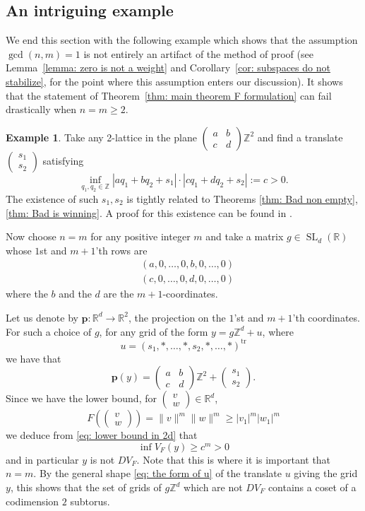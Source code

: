 \documentclass[reqno,11pt, twoside]{amsart}
\theoremstyle{plain}
\theoremstyle{definition}
\newtheorem{exmp}[thm]{Example}
\theoremstyle{definition}
\theoremstyle{remark}
\numberwithin{equation}{section}
\newcommand{\SL}{\operatorname{SL}}
\newcommand{\bR}{\mathbb{R}}
\newcommand{\bZ}{\mathbb{Z}}
\newcommand\norm[1]{\|#1\|}
\newcommand\pa[1]{\left(#1\right)}
\newcommand\av[1]{|#1|}
\newcommand\on[1]{\operatorname{#1}}
\newcommand\mb[1]{\mathbf{#1}}
\newcommand\mat[1]{\pa{\begin{matrix}#1\end{matrix}}}
\newcommand\smallmat[1]{\pa{\begin{smallmatrix}#1\end{smallmatrix}}}
\begin{document}
\subsection{An intriguing example}
We end this section with the following example which shows that the assumption
$\gcd(n,m)=1$ is not entirely an artifact of the method of proof (see Lemma~\ref{lemma: zero is not a weight} and Corollary~\ref{cor: subspaces do not stabilize}, for the point where this assumption enters our discussion). 
It shows that the statement of Theorem~\ref{thm: main theorem F formulation} can fail drastically when $n=m\ge 2$.
\begin{exmp}
    \label{exmp: counter n=m}
    Take any 2-lattice in the plane $\smallmat{a&b\\c&d}\bZ^2$ and find a translate $\smallmat{s_1\\ s_2}$
    satisfying 
    \begin{equation}
        \label{eq: lower bound in 2d}
    \inf_{q_1,q_2\in \bZ}\av{aq_1+bq_2+s_1}\cdot\av{cq_1+dq_2+s_2}:=c>0. 
    \end{equation}
    The existence of such $s_1,s_2$ is tightly related to Theorems 
    \ref{thm: Bad non empty}, \ref{thm: Bad is winning}. 
    A proof for this existence can be found in
    \cite[Theorem 1]{D}. 
    
    Now choose $n=m$ for any positive integer $m$ and take a matrix $g\in \SL_d(\bR)$ whose $1$st and $m+1$'th rows are
    \begin{align*}
        &(a,0,\dots,0,b,0,\dots,0)\\
        &(c,0,\dots,0,d,0,\dots,0)
    \end{align*}
    where the $b$ and the $d$ are the $m+1$-coordinates. 

    Let us denote by $\mb{p}:\bR^d\to \bR^2$, the projection on the $1$'st and $m+1$'th coordinates. For such a choice of $g$, 
    for any grid of the form $y= g\bZ^d+ u$, where
    \begin{equation}
        \label{eq: the form of u}
        u=(s_1,*,\dots,*, s_2,*,\dots,*)^{\on{tr}}
    \end{equation}
    we have that 
    $$\mb{p}(y) = \mat{a&b\\c&d}\bZ^2+\mat{s_1\\s_2}.$$
    Since we have the lower bound, for $\smallmat{v\\w}\in \bR^d$,
    $$F(\smallmat{v\\w})=\norm{v}^m\norm{w}^m\ge \av{v_1}^m\av{w_1}^m$$
    we deduce from \eqref{eq: lower bound in 2d} that 
    $$\inf V_F(y)\ge c^m>0$$
    and in particular $y$ is not $DV_F$. Note that this is where it is important that $n=m$. By the general shape \eqref{eq: the form of u} of the translate $u$ giving the grid $y$, this shows that the set of grids of 
    $g\bZ^d$ which are not $DV_F$ contains a coset of a codimension $2$ subtorus.


\end{exmp}
\end{document}
